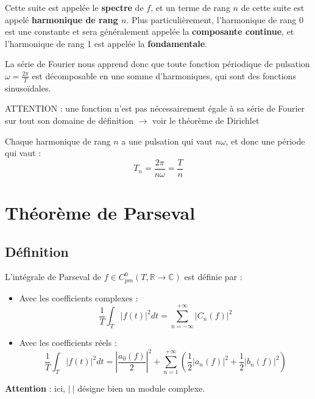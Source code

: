 \documentclass[12pt, a4paper]{article}
\begin{document}
Cette suite est appelée le \textbf{spectre} de $f$, et un terme de rang $n$ de cette suite est appelé \textbf{harmonique de rang $n$}. Plus particulièrement, l'harmonique de rang 0 est une constante et sera généralement appelée la \textbf{composante continue}, et l'harmonique de rang 1 est appelée la \textbf{fondamentale}.

La série de Fourier nous apprend donc que toute fonction périodique de pulsation $\displaystyle \omega = \frac{2\pi}{T}$ est décomposable en une somme d'harmoniques, qui sont des fonctions sinusoïdales.

\begin{tcolorbox}
	ATTENTION : une fonction n'est pas nécessairement égale à sa série de Fourier sur tout son domaine de définition $\rightarrow$ voir le théorème de Dirichlet
\end{tcolorbox}

Chaque harmonique de rang $n$ a une pulsation qui vaut $n\omega$, et donc une période qui vaut :
\begin{equation*}
	T_n = \frac{2\pi}{n\omega} = \frac{T}{n}
\end{equation*}



\clearpage




\section{Théorème de Parseval}

\subsection{Définition}

\begin{tcolorbox}
	L'intégrale de Parseval de $f \in C_{pm}^0(T, \mathbb{R} \to \mathbb{C})$ est définie par :
	
	\begin{itemize}
		\item Avec les coefficients complexes :
			\begin{equation*}
				\frac{1}{T} \int_T |f(t)|^2 dt = \sum_{n=-\infty}^{+\infty} |C_n(f)|^2
			\end{equation*}
		\item Avec les coefficients réels :
			\begin{equation*}
				\frac{1}{T} \int_T |f(t)|^2 dt = \left|\frac{a_0(f)}{2}\right|^2 + \sum_{n=1}^{+\infty} \left( \frac{1}{2}|a_n(f)|^2 + \frac{1}{2}|b_n(f)|^2 \right)
			\end{equation*}
	\end{itemize}

	\textbf{Attention} : ici, $|~|$ désigne bien un module complexe.
\end{tcolorbox}
\end{document}
